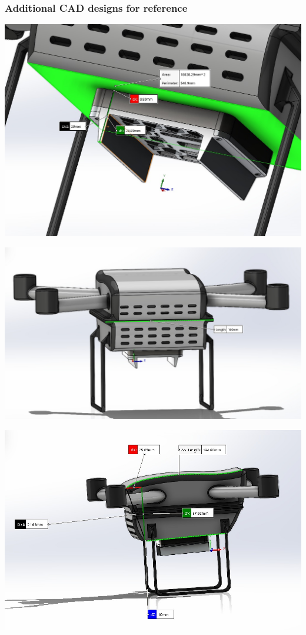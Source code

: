 \documentclass[12pt]{report}
\begin{document}
    \subsubsection{\large Additional CAD designs for reference}
    \begin{minipage}{0.4\textwidth}
    \centering
    \includegraphics[width=\linewidth]{1.jpeg}
\end{minipage}%
\hfill %
\begin{minipage}{0.4\textwidth}
    \centering
    \includegraphics[width=\linewidth]{2.jpeg}
\end{minipage}
\begin{minipage}{0.4\textwidth}
    \centering
    \includegraphics[width=\linewidth]{3.jpeg}
\end{minipage}%
\end{document}
